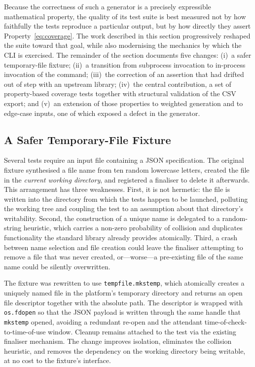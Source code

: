 \documentclass[
  digital, %
  oneside, %
  lof,     %
  nolot,     %
]{fithesis4}
\begin{document}
Because the correctness of such a generator is a precisely expressible
mathematical property, the quality of its test suite is best measured not by how
faithfully the tests reproduce a particular output, but by how directly they
assert Property~\eqref{eq:coverage}. The work described in this section
progressively reshaped the suite toward that goal, while also modernising the
mechanics by which the \gls{CLI} is exercised. The remainder of the
section documents five changes: (i)~a safer temporary-file fixture;
(ii)~a transition from subprocess invocation to in-process invocation of the
command; (iii)~the correction of an assertion that had drifted out of step with
an upstream library; (iv)~the central contribution, a set of property-based
coverage tests together with structural validation of the \gls{CSV} export; and
(v)~an extension of those properties to weighted generation and to edge-case
inputs, one of which exposed a defect in the generator.

\subsection{A Safer Temporary-File Fixture}
\label{sec:tsi-tempfile}

Several tests require an input file containing a \gls{JSON} specification. The original
fixture synthesised a file name from ten random lowercase letters, created the
file in the \emph{current working directory}, and registered a finaliser to
delete it afterwards. This arrangement has three weaknesses. First, it is not
hermetic: the file is written into the directory from which the tests happen to
be launched, polluting the working tree and coupling the test to an assumption
about that directory's writability. Second, the construction of a unique name is
delegated to a random-string heuristic, which carries a non-zero probability of
collision and duplicates functionality the standard library already provides
atomically. Third, a crash between name selection and file creation could leave
the finaliser attempting to remove a file that was never created, or---worse---a
pre-existing file of the same name could be silently overwritten.

The fixture was rewritten to use \texttt{tempfile.mkstemp}, which atomically
creates a uniquely named file in the platform's temporary directory and returns
an open file descriptor together with the absolute path. The descriptor is
wrapped with \texttt{os.fdopen} so that the \gls{JSON} payload is written through the
same handle that \texttt{mkstemp} opened, avoiding a redundant re-open and the
attendant time-of-check-to-time-of-use window. Cleanup remains attached to the
test via the existing finaliser mechanism. The change improves isolation,
eliminates the collision heuristic, and removes the dependency on the working
directory being writable, at no cost to the fixture's interface.
\end{document}
